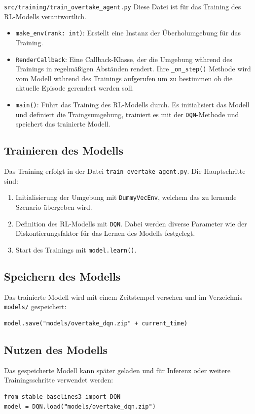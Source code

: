 \texttt{src/training/train\_overtake\_agent.py}
Diese Datei ist für das Training des RL-Modells verantwortlich.

\begin{itemize}
    \item \texttt{make\_env(rank: int)}: Erstellt eine Instanz der Überholumgebung für das Training.
    \item \texttt{RenderCallback}: Eine Callback-Klasse, der die Umgebung während des Trainings in regelmäßigen Abständen rendert. Ihre \texttt{\_on\_step()} Methode wird vom Modell während des Trainings aufgerufen um zu bestimmen ob die aktuelle Episode gerendert werden soll.
    \item \texttt{main()}: Führt das Training des RL-Modells durch. Es initialisiert das Modell und definiert die Traingsumgebung, trainiert es mit der \texttt{DQN}-Methode und speichert das trainierte Modell.
\end{itemize}

\subsection{Trainieren des Modells}
Das Training erfolgt in der Datei \texttt{train\_overtake\_agent.py}. Die Hauptschritte sind:
\begin{enumerate}
    \item Initialisierung der Umgebung mit \texttt{DummyVecEnv}, welchem das zu lernende Szenario übergeben wird.
    \item Definition des RL-Modells mit \texttt{DQN}. Dabei werden diverse Parameter wie der Diskontierungsfaktor für das Lernen des Modells festgelegt.
    \item Start des Trainings mit \texttt{model.learn()}.
\end{enumerate}

\subsection{Speichern des Modells}
Das trainierte Modell wird mit einem Zeitstempel versehen und im Verzeichnis \texttt{models/} gespeichert:
\begin{lstlisting}
model.save("models/overtake_dqn.zip" + current_time)
\end{lstlisting}

\subsection{Nutzen des Modells}
Das gespeicherte Modell kann später geladen und für Inferenz oder weitere Trainingsschritte verwendet werden:
\begin{lstlisting}
from stable_baselines3 import DQN
model = DQN.load("models/overtake_dqn.zip")
\end{lstlisting}